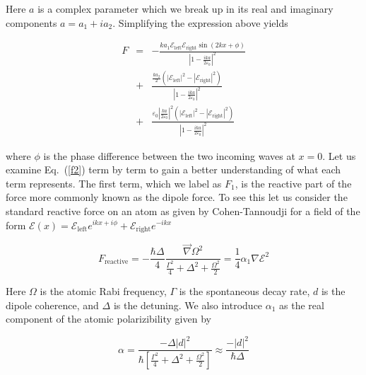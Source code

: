 \documentclass[twocolumn,english,pra,aps,superscriptaddress,floatfix]{revtex4-1}
\begin{document}
Here $a$ is a complex parameter which we break up in its real and imaginary components $a=a_{1}+ia_{2}$. Simplifying the expression above yields

\begin{eqnarray}
F &=&-\frac{ka_{1}\mathcal{E}_{\mathrm{left}}\mathcal{E}_{\mathrm{right}}\sin\left(2kx+\phi\right)}{\left|1-\frac{ika}{2\varepsilon_{0}}\right|^{2}} \nonumber \\
&+&\frac{\frac{ka_{2}}{2}\left(\left|\mathcal{E}_{\mathrm{left}}\right|^{2}-\left|\mathcal{E}_{\mathrm{right}}\right|^{2}\right)}{\left|1-\frac{ika}{2\varepsilon_{0}}\right|^{2}} \nonumber \\
&+&\frac{\varepsilon_{0}\left|\frac{ka}{2\varepsilon_{0}}\right|^{2}\left(\left|\mathcal{E}_{\mathrm{left}}\right|^{2}-\left|\mathcal{E}_{\mathrm{right}}\right|^{2}\right)}{\left|1-\frac{ika}{2\varepsilon_{0}}\right|^{2}}
\label{f2}
\end{eqnarray}



where $\phi$ is the phase difference between the two incoming waves at $x=0$. Let us examine Eq.\ (\ref{f2}) term by term to gain a better understanding
of what each term represents. The first term, which we label as $F_{1}$, is the reactive part of the force more commonly known as the dipole force. To see this let us consider the standard reactive force on an atom as given by Cohen-Tannoudji \cite{cohentannoudji} for a field of the form $\mathcal{E}(x)=\mathcal{E}_{\mathrm{left}}e^{ikx+i\phi}+\mathcal{E}_{\mathrm{right}}e^{-ikx}$ 

\begin{equation}
F_{\mathrm{reactive}}=-\frac{\hbar\Delta}{4}\frac{\overrightarrow{\nabla}\Omega^{2}}{\frac{\Gamma^{2}}{4}+\Delta^{2}+\frac{\Omega^{2}}{2}}=\frac{1}{4}\alpha_{1}\nabla \mathcal{E}^{2}
\label{cohentannoudjiforce1}
\end{equation}

Here $\Omega$ is the atomic Rabi frequency, $\Gamma$ is the spontaneous decay rate, $d$ is the dipole coherence, and $\Delta$ is the detuning.
We also introduce $\alpha_{1}$ as the real component of the atomic polarizibility given by

\begin{equation}
\alpha=\frac{-\Delta\left|d\right|^{2}}{\hbar\left[\frac{\Gamma^{2}}{4}+\Delta^{2}+\frac{\Omega^{2}}{2}\right]}\approx\frac{-\left|d\right|^{2}}{\hbar\Delta}
\label{polarizibility1}
\end{equation}
\end{document}
